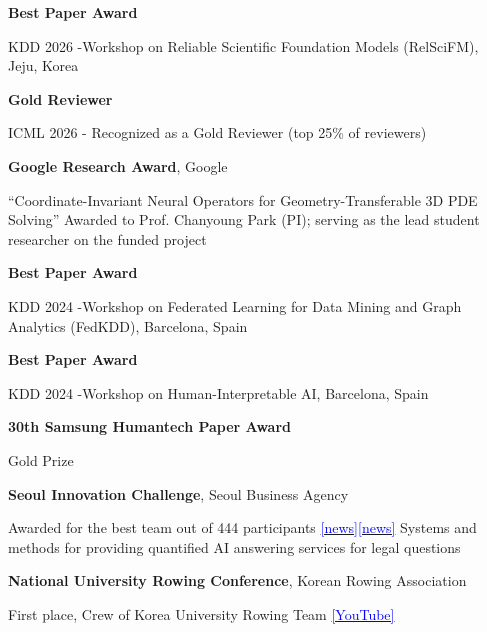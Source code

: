 \documentclass[letterpaper,MMMyyyy,nonstopmode]{simpleresumecv}
\begin{document}
\begin{Body}
\Gap
\BulletItem
\textbf{Best Paper Award}
\hfill
{}
\begin{Detail}
\Item
KDD 2026 -Workshop on Reliable Scientific Foundation Models (RelSciFM), Jeju, Korea
\end{Detail}

\Gap
\BulletItem
\textbf{Gold Reviewer}
\hfill
{}
\begin{Detail}
\Item
ICML 2026 - Recognized as a Gold Reviewer (top 25\% of reviewers)
\end{Detail}

\Gap
\BulletItem
\textbf{Google Research Award}, Google
\hfill
{}
\begin{Detail}
\Item
``Coordinate-Invariant Neural Operators for Geometry-Transferable 3D PDE Solving''
\Item
Awarded to Prof. Chanyoung Park (PI); serving as the lead student researcher on the funded project
\end{Detail}

\Gap
\BulletItem
\textbf{Best Paper Award}
\hfill
{}
\begin{Detail}
\Item
KDD 2024 -Workshop on Federated Learning for Data Mining and Graph Analytics (FedKDD), Barcelona, Spain
\end{Detail}

\Gap
\BulletItem
\textbf{Best Paper Award}
\hfill
{}
\begin{Detail}
\Item
KDD 2024 -Workshop on Human-Interpretable AI, Barcelona, Spain
\end{Detail}

\Gap
\BulletItem
\textbf{30th Samsung Humantech Paper Award}
\hfill
{}
\begin{Detail}
\Item
Gold Prize
\end{Detail}

\Gap
\BulletItem
\textbf{Seoul Innovation Challenge},
Seoul Business Agency
\hfill
{}
\begin{Detail}
\Item
Awarded for the best team out of 444 participants 
\href{https://mediahub.seoul.go.kr/archives/2001375}{\textcolor{blue}{[news]}}\href{https://www.eachj.co.kr/news/articleView.html?idxno=1581}{\textcolor{blue}{[news]}}
\newline
Systems and methods for providing quantified AI answering services for legal questions 
\end{Detail}

\Gap
\BulletItem
\textbf{National University Rowing Conference}, Korean Rowing Association
\hfill
{}
\begin{Detail}
\Item
First place, Crew of Korea University Rowing Team \href{https://www.youtube.com/watch?v=crpTdGXkIOg}{\textcolor{blue}{[YouTube]}}
\end{Detail}


\end{Body}
\end{document}
